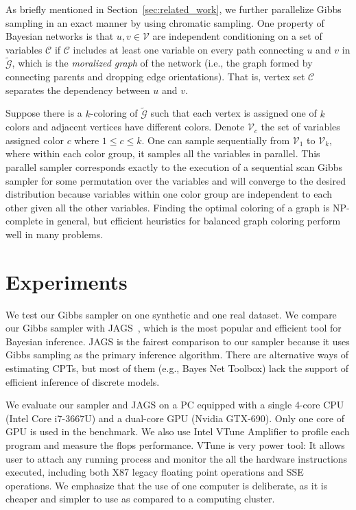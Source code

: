 \documentclass{article} %
\begin{document}
As briefly mentioned in Section~\ref{sec:related_work}, we further parallelize Gibbs sampling in an
exact manner by using chromatic sampling. One property of Bayesian networks is that $u, v \in
\mathcal{V}$ are independent conditioning on a set of variables $\mathcal{C}$ if $\mathcal{C}$
includes at least one variable on every path connecting $u$ and $v$ in $\tilde{\mathcal{G}}$, which
is the \emph{moralized graph} of the network (i.e., the graph formed by connecting parents and
dropping edge orientations). That is, vertex set $\mathcal{C}$ separates the dependency between $u$
and $v$.

Suppose there is a $k$-coloring of $\tilde{\mathcal{G}}$ such that each vertex is assigned one of $k$
colors and adjacent vertices have different colors. Denote $\mathcal{V}_c$ the set of variables
assigned color $c$ where $1 \leq c \leq k$. One can sample sequentially from $\mathcal{V}_1$ to
$\mathcal{V}_k$, where within each color group, it samples all the variables in parallel. This
parallel sampler corresponds exactly to the execution of a sequential scan Gibbs sampler for some
permutation over the variables and will converge to the desired distribution because variables
within one color group are independent to each other given all the other variables. Finding the
optimal coloring of a graph is NP-complete in general, but efficient heuristics for balanced graph
coloring perform well in many problems.





\section{Experiments}\label{sec:experiments}

We test our Gibbs sampler on one synthetic and one real dataset.  We compare our Gibbs sampler with
JAGS~\citep{JAGS2003}, which is the most popular and efficient tool for Bayesian inference. JAGS is
the fairest comparison to our sampler because it uses Gibbs sampling as the primary inference
algorithm. There are alternative ways of estimating CPTs, but most of them (e.g., Bayes Net Toolbox)
lack the support of efficient inference of discrete models.

We evaluate our sampler and JAGS on a PC equipped with a single 4-core CPU (Intel Core i7-3667U)
and a dual-core GPU (Nvidia GTX-690). Only one core of GPU is used in the benchmark. We also use
Intel VTune Amplifier to profile each program and measure the flops performance. VTune is very power
tool: It allows user to attach any running process and monitor the all the hardware instructions
executed, including both X87 legacy floating point operations and SSE operations.  We emphasize that
the use of one computer is deliberate, as it is cheaper and simpler to use as compared to a
computing cluster.
\end{document}
